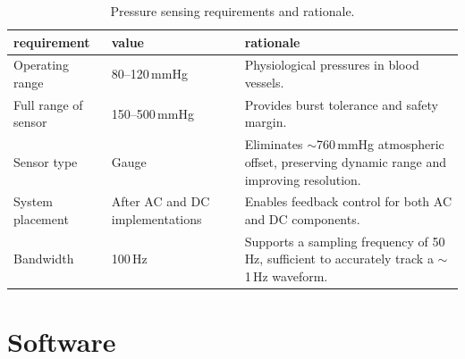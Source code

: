 \documentclass[10pt, a4paper]{article}
\begin{document}
\begin{table}[H]
    \small
    \centering
    \begin{tabularx}{\linewidth}{>{\raggedright\arraybackslash}p{4cm} p{3cm} X}
        \toprule
        \textbf{requirement} & \textbf{value}                                                                                    & \textbf{rationale} \\
        \midrule

        Operating range
                             & 80--120\,mmHg
                             & Physiological pressures in blood vessels.                                                                              \\

        Full range of sensor
                             & 150--500\,mmHg
                             & Provides burst tolerance and safety margin.                                                                            \\

        Sensor type
                             & Gauge
                             & Eliminates $\sim$760\,mmHg atmospheric offset, preserving dynamic range and improving resolution.                      \\

        System placement
                             & After AC and DC implementations
                             & Enables feedback control for both AC and DC components.                                                                \\

        Bandwidth
                             & 100\,Hz
                             & Supports a sampling frequency of 50\,Hz, sufficient to accurately track a $\sim$1\,Hz waveform.                        \\

        \bottomrule
    \end{tabularx}
    \caption{Pressure sensing requirements and rationale.}
\end{table}

\section{Software}
\end{document}
